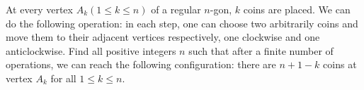At every vertex $A_k(1\le k\le n)$ of a regular $n$-gon, $k$ coins are placed. We can do the following operation: in each step, one can choose two arbitrarily coins and move them to their adjacent vertices respectively, one clockwise and one anticlockwise. Find all positive integers $n$ such that after a finite number of operations, we can reach the following configuration: there are $n+1-k$ coins at vertex $A_k$ for all $1\le k\le n$.